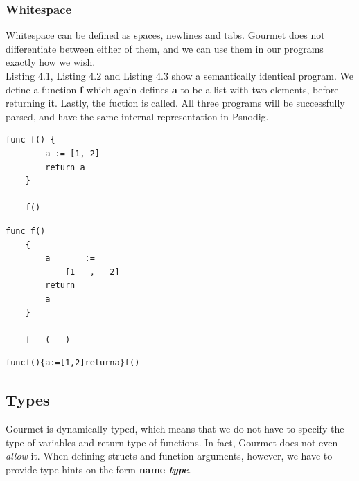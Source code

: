 \subsubsection{Whitespace}

Whitespace can be defined as spaces, newlines and tabs. Gourmet does not differentiate between either of them, and we can use them in our programs exactly how we wish. \hfill \\

Listing 4.1, Listing 4.2 and Listing 4.3 show a semantically identical program. We define a function \textbf{f} which again defines \textbf{a} to be a list with two elements, before returning it. Lastly, the fuction is called. All three programs will be successfully parsed, and have the same internal representation in Psnodig. \hfill \\

\begin{lstlisting}[caption={f with a standard amount of whitespace}, captionpos=b, frame=tlrb]
    func f() {
        a := [1, 2]
        return a
    }

    f()    
\end{lstlisting}

\begin{lstlisting}[caption={f with a lot of whitespace}, captionpos=b, frame=tlrb]
    func f()
    {
        a       :=
            [1   ,   2]
        return
        a
    }
    
    f   (   )
\end{lstlisting}

\begin{lstlisting}[caption={f with no whitespace}, captionpos=b, frame=tlrb]
    funcf(){a:=[1,2]returna}f()
\end{lstlisting}


\subsection{Types}

Gourmet is dynamically typed, which means that we do not have to specify the type of variables and return type of functions. In fact, Gourmet does not even \textit{allow} it. When defining structs and function arguments, however, we have to provide type hints on the form \textbf{name \textit{type}}. \hfill \\

